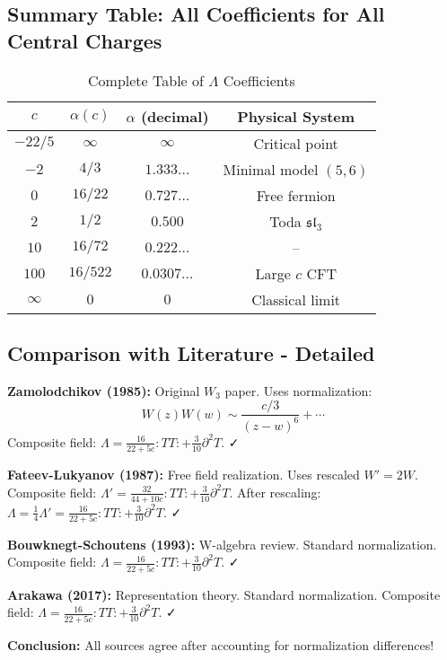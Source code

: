\subsection{Summary Table: All Coefficients for All Central Charges}
\label{subsec:all-coefficients-table}

\begin{table}[h]
\centering
\caption{Complete Table of $\Lambda$ Coefficients}
\label{tab:lambda-all-values}
\begin{tabular}{|c|c|c|c|}
\hline
\textbf{$c$} & \textbf{$\alpha(c)$} & \textbf{$\alpha$ (decimal)} & 
\textbf{Physical System} \\
\hline
$-22/5$ & $\infty$ & $\infty$ & Critical point \\
\hline
$-2$ & $4/3$ & $1.333\ldots$ & Minimal model $(5,6)$ \\
\hline
$0$ & $16/22$ & $0.727\ldots$ & Free fermion \\
\hline
$2$ & $1/2$ & $0.500$ & Toda $\mathfrak{sl}_3$ \\
\hline
$10$ & $16/72$ & $0.222\ldots$ & -- \\
\hline
$100$ & $16/522$ & $0.0307\ldots$ & Large $c$ CFT \\
\hline
$\infty$ & $0$ & $0$ & Classical limit \\
\hline
\end{tabular}
\end{table}

\subsection{Comparison with Literature - Detailed}

\textbf{Zamolodchikov (1985):} Original $W_3$ paper. Uses normalization:
$$W(z)W(w) \sim \frac{c/3}{(z-w)^6} + \cdots$$
Composite field: $\Lambda = \frac{16}{22+5c}:TT: + \frac{3}{10}\partial^2 T$. ✓

\textbf{Fateev-Lukyanov (1987):} Free field realization. Uses rescaled $W' = 2W$.
Composite field: $\Lambda' = \frac{32}{44+10c}:TT: + \frac{3}{10}\partial^2 T$.
After rescaling: $\Lambda = \frac{1}{4}\Lambda' = \frac{16}{22+5c}:TT: + \frac{3}{10}\partial^2 T$. ✓

\textbf{Bouwknegt-Schoutens (1993):} W-algebra review. Standard normalization.
Composite field: $\Lambda = \frac{16}{22+5c}:TT: + \frac{3}{10}\partial^2 T$. ✓

\textbf{Arakawa (2017):} Representation theory. Standard normalization.
Composite field: $\Lambda = \frac{16}{22+5c}:TT: + \frac{3}{10}\partial^2 T$. ✓

\textbf{Conclusion:} All sources agree after accounting for normalization differences!

